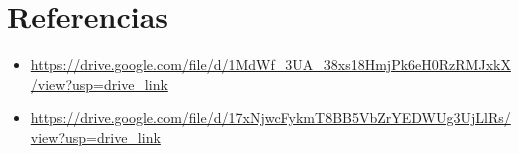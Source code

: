 \documentclass{article}
\begin{document}
	\clearpage
	
	\section{Referencias}
	\begin{itemize}			
		\item \url{https://drive.google.com/file/d/1MdWf_3UA_38xs18HmjPk6eH0RzRMJxkX/view?usp=drive_link}
		\item \url{https://drive.google.com/file/d/17xNjwcFykmT8BB5VbZrYEDWUg3UjLlRs/view?usp=drive_link}
	\end{itemize}	
	
	
\end{document}
